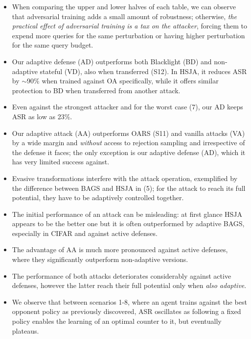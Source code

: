 \begin{itemize}[leftmargin=*]
    \setlength\itemsep{0.5em}
    \item When comparing the upper and lower halves of each table, we can observe that adversarial training adds a small amount of robustness; otherwise, \emph{the practical effect of adversarial training is a tax on the attacker}, forcing them to expend more queries for the same perturbation or having higher perturbation for the same query budget.
    \item Our adaptive defense (AD) outperforms both Blacklight (BD) and non-adaptive stateful (VD), also when transferred (S12). In HSJA, it reduces ASR by $\sim$90\% when trained against OA specifically, while it offers similar protection to BD when transferred from another attack.
    \item Even against the strongest attacker and for the worst case (7), our AD keeps ASR as low as 23\%.
    \item Our adaptive attack (AA) outperforms OARS (S11) and vanilla attacks (VA) by a wide margin and \textit{without} access to rejection sampling and irrespective of the defense it faces; the only exception is our adaptive defense (AD), which it has very limited success against.
    \item Evasive transformations interfere with the attack operation, exemplified by the difference between BAGS and HSJA in (5); for the attack to reach its full potential, they have to be adaptively controlled together.
    \item The initial performance of an attack can be misleading: at first glance HSJA appears to be the better one but it is often outperformed by adaptive BAGS, especially in CIFAR and against active defenses.
    \item The advantage of AA is much more pronounced against active defenses, where they significantly outperform non-adaptive versions.
    \item The performance of both attacks deteriorates considerably against active defenses, however the latter reach their full potential only when \emph{also adaptive}.
    \item We observe that between scenarios 1-8, where an agent trains against the best opponent policy as previously discovered, ASR oscillates as following a fixed policy enables the learning of an optimal counter to it, but eventually plateaus.

\end{itemize}
